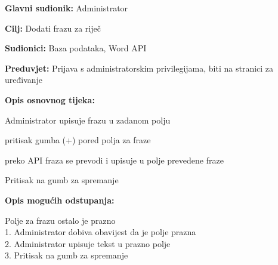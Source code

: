 					\noindent {}
					\begin{packed_item}
						\item \textbf{Glavni sudionik:} Administrator
						\item \textbf{Cilj:} Dodati frazu za riječ
						\item \textbf{Sudionici:} Baza podataka, Word API
						\item \textbf{Preduvjet:} Prijava s administratorskim privilegijama, biti na stranici za uređivanje
						\item \textbf{Opis osnovnog tijeka:}
						\begin{packed_enum}
							\item Administrator upisuje frazu u zadanom polju
							\item pritisak gumba (+) pored polja za fraze
							\item preko API fraza se prevodi i upisuje u polje prevedene fraze
							\item Pritisak na gumb za spremanje
						\end{packed_enum}
						\item \textbf{Opis mogućih odstupanja:}
						\begin{packed_item}
							\item [4.a] Polje za frazu ostalo je prazno
							\\1. Administrator dobiva obavijest da je polje prazna
							\\2. Administrator upisuje tekst u prazno polje
							\\3. Pritisak na gumb za spremanje
						\end{packed_item}
					\end{packed_item}
					
